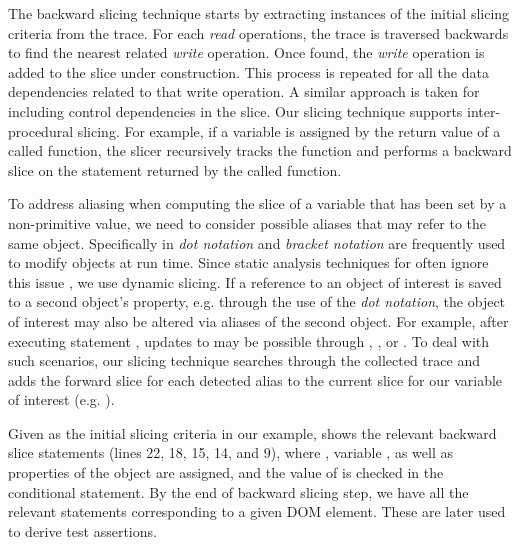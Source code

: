 The backward slicing technique starts by extracting instances of the initial slicing criteria from the trace. For each \textit{read} operations, the trace is traversed backwards to find the nearest related \textit{write} operation. Once found, the \textit{write} operation is added to the slice under construction. This process is repeated for all the data dependencies related to that write operation. A similar approach is taken for including control dependencies in the slice. 
Our slicing technique supports inter-procedural slicing. For example, if a variable is assigned by the return value of a called function, the slicer recursively tracks the function and performs a backward slice on the statement returned by the called function.
  
To address aliasing when computing the slice of a variable that has been set by a non-primitive value, we need to consider possible aliases that may refer to the same object. Specifically in \javascript \textit{dot notation} and \textit{bracket notation} are frequently used to modify objects at run time. Since static analysis techniques for \javascript often ignore this issue \cite{Feldthaus:icse13}, we use dynamic slicing. If a reference to an object of interest is saved to a second object's property, e.g. through the use of the \textit{dot notation}, the object of interest may also be altered via aliases of the second object. For example, after executing statement , updates to  may be possible through , , or . To deal with such scenarios, our slicing technique searches through the collected trace and adds the forward slice for each detected alias to the current slice for our variable of interest (e.g. ). 

Given  as the initial slicing criteria in our example,  shows the relevant backward slice statements (lines 22, 18, 15, 14, and 9), where ,  variable , as well as properties of the object  are assigned, and the value of  is checked in the conditional statement.
By the end of backward slicing step, we have all the relevant statements corresponding to a given DOM element. These are later used to derive test assertions.    